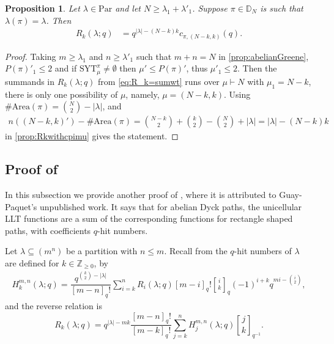 \documentclass[12pt,reqno]{amsart}
\theoremstyle{plain}
\newtheorem{proposition}[theorem]{Proposition}
\theoremstyle{definition}
\theoremstyle{remark}
\theoremstyle{example}
\numberwithin{equation}{section}
\newcommand\ZZ{\mathbb{Z}}
\newcommand\Par{\mathrm{Par}}
\newcommand\up{\mathrm{up}}
\newcommand\arm{\mathrm{arm}}
\newcommand{\coleg}{\mathrm{coleg}}
\newcommand{\SYT}{\mathrm{SYT}}
\newcommand{\wt}{\mathrm{wt}}
\newcommand{\Area}{\mathrm{Area}}
\newcommand{\DD}{\mathbb{D}}
\begin{document}
\begin{proposition}\label{prop:Rkabelian}
	Let $\lambda \in \Par$ and let $N \geq \lambda_1+\lambda'_1$. Suppose $\pi \in \DD_N$ is such that $\lambda(\pi) = \lambda$. Then \begin{align}\label{eq:Rkabelian}
		R_k(\lambda;q) &= q^{|\lambda|-(N-k)k} c_{\pi,(N-k,k)}(q). 
	\end{align}
\end{proposition}

\begin{proof}
	Taking $m \geq \lambda_1$ and $n \geq \lambda'_1$ such that $m+n = N$ in \autoref{prop:abelianGreene}, $P(\pi)'_1 \leq 2$ and if $\SYT^\pi_\mu \neq \emptyset$ then $\mu' \leq P(\pi)'$, thus $\mu'_1 \leq 2$. Then the summands in $R_k(\lambda;q)$ from \eqref{eq:R_k=sumwt} runs over $\mu \vdash N$ with $\mu_1 = N-k$, there is only one possibility of $\mu$, namely, $\mu = (N-k,k)$. 
	Using $\# \Area(\pi) = \binom{N}{2} - |\lambda|$, and \begin{align*}
		n((N-k,k)') - \#\Area(\pi) = \binom{N-k}{2} + \binom{k}{2} - \binom{N}{2} + |\lambda| = |\lambda| - (N-k)k
	\end{align*} in \autoref{prop:Rkwithcpimu} gives the statement.
	
\end{proof}

\subsection{Proof of \cite[Theorem 1.3]{CMP_rook}}
In this subsection we provide another proof of \cite[Theorem 1.3]{CMP_rook}, where it is attributed to Guay-Paquet's unpublished work. It says that for abelian Dyck paths, the unicellular LLT functions are a sum of the corresponding functions for rectangle shaped paths, with coefficients $q$-hit numbers.



Let $\lambda \subseteq (m^n)$ be a partition with $n \leq m$. Recall from \cite[Definition 2.3]{CMP_rook} the $q$-hit numbers of $\lambda$ are defined for $k \in \ZZ_{\geq 0}$, by \begin{align}
	H_k^{m,n}(\lambda;q) = \dfrac{q^{\binom{k}{2}-|\lambda|}}{[m-n]_q!} \sum_{i=k}^{n} R_i(\lambda;q) [m-i]_q! {i \brack k}_q (-1)^{i+k} q^{mi - \binom{i}{2}},
\end{align} and the reverse relation is \cite[(2.3)]{CMP_rook} \begin{equation}\label{eq:RkabwrtH}
	R_k(\lambda;q) = q^{|\lambda|-mk} \dfrac{[m-n]_q!}{[m-k]_q!} \sum_{j=k}^{n} H_j^{m,n}(\lambda;q) {j \brack k}_{q^{-1}}.
\end{equation}
\end{document}
